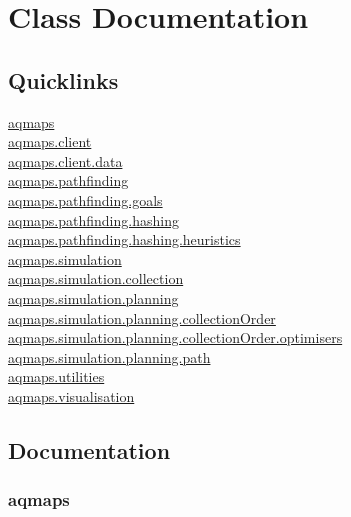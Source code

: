 \documentclass[10pt,a4paper]{article}
\begin{document}
\section{Class Documentation}

\subsection{Quicklinks}
\hyperref[sec:aqmaps]{aqmaps}\\
\hyperref[sec:aqmaps.client]{aqmaps.client}\\
\hyperref[sec:aqmaps.client.data]{aqmaps.client.data}\\
\hyperref[sec:aqmaps.pathfinding]{aqmaps.pathfinding}\\
\hyperref[sec:aqmaps.pathfinding.goals]{aqmaps.pathfinding.goals}\\
\hyperref[sec:aqmaps.pathfinding.hashing]{aqmaps.pathfinding.hashing}\\
\hyperref[sec:aqmaps.pathfinding.heuristics]{aqmaps.pathfinding.hashing.heuristics}\\
\hyperref[sec:aqmaps.simulation]{aqmaps.simulation}\\
\hyperref[sec:aqmaps.simulation.collection]{aqmaps.simulation.collection}\\
\hyperref[sec:aqmaps.simulation.planning]{aqmaps.simulation.planning}\\
\hyperref[sec:aqmaps.simulation.planning.collectionOrder]{aqmaps.simulation.planning.collectionOrder}\\
\hyperref[sec:aqmaps.simulation.planning.collectionOrder.optimisers]{aqmaps.simulation.planning.collectionOrder.optimisers}\\
\hyperref[sec:aqmaps.simulation.planning.path]{aqmaps.simulation.planning.path}\\
\hyperref[sec:aqmaps.utilities]{aqmaps.utilities}\\
\hyperref[sec:aqmaps.visualisation]{aqmaps.visualisation}\\

\subsection{Documentation}

\subsubsection{aqmaps}
\label{sec:aqmaps}
\small
\end{document}

